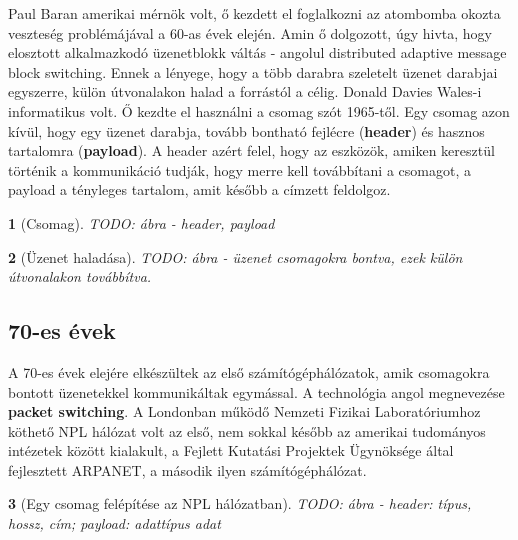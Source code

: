 \documentclass[a4paper, 12pt, oneside]{article}
\newtheorem*{defin}{}
\begin{document}
Paul Baran amerikai mérnök volt, ő kezdett el foglalkozni az atombomba okozta veszteség problémájával a 60-as évek elején. Amin ő dolgozott, úgy hivta, hogy elosztott alkalmazkodó üzenetblokk váltás - angolul distributed adaptive message block switching. Ennek a lényege, hogy a több darabra szeletelt üzenet darabjai egyszerre, külön útvonalakon halad a forrástól a célig. Donald Davies Wales-i informatikus volt. Ő kezdte el használni a csomag szót 1965-től.
\bigbreak
Egy csomag azon kívül, hogy egy üzenet darabja, tovább bontható fejlécre (\textbf{header}) és hasznos tartalomra (\textbf{payload}). A header azért felel, hogy az eszközök, amiken keresztül történik a kommunikáció tudják, hogy merre kell továbbítani a csomagot, a payload a tényleges tartalom, amit később a címzett feldolgoz.

\begin{center}
\begin{defin}[Csomag]
TODO: ábra - header, payload
\end{defin}
\end{center}

\begin{center}
\begin{defin}[Üzenet haladása]
TODO: ábra - üzenet csomagokra bontva, ezek külön útvonalakon továbbítva.
\end{defin}
\end{center}

\subsection*{70-es évek}

A 70-es évek elejére elkészültek az első számítógéphálózatok, amik csomagokra bontott üzenetekkel kommunikáltak egymással. A technológia angol megnevezése \textbf{packet switching}. A Londonban működő Nemzeti Fizikai Laboratóriumhoz köthető NPL hálózat volt az első, nem sokkal később az amerikai tudományos intézetek között kialakult, a Fejlett Kutatási Projektek Ügynöksége által fejlesztett ARPANET, a második ilyen számítógéphálózat.

\begin{center}
\begin{defin}[Egy csomag felépítése az NPL hálózatban]
TODO: ábra - header: típus, hossz, cím; payload: adattípus adat
\end{defin}
\end{center}
\end{document}
